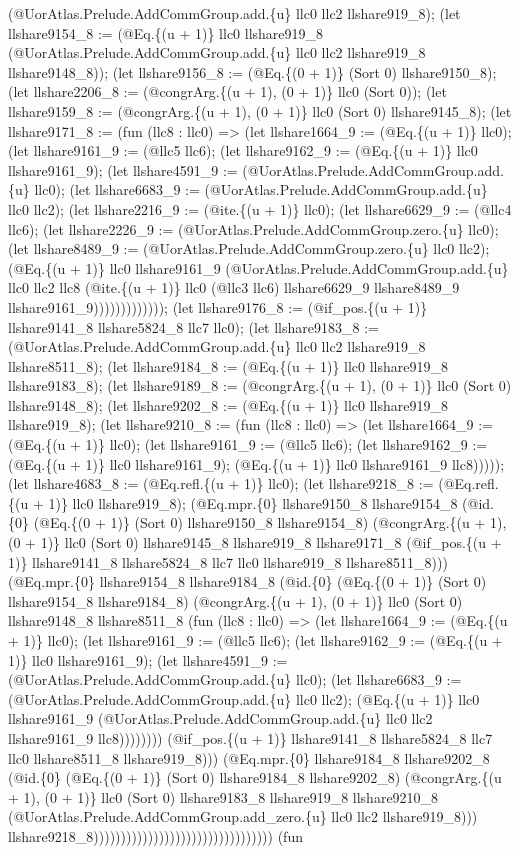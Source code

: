 \documentclass[11pt]{article}
\begin{document}
(@UorAtlas.Prelude.AddCommGroup.add.\{u\} llc0 llc2 llshare919\_8); (let llshare9154\_8 := (@Eq.\{(u + 1)\} llc0 llshare919\_8 (@UorAtlas.Prelude.AddCommGroup.add.\{u\} llc0 llc2 llshare919\_8 llshare9148\_8)); (let llshare9156\_8 := (@Eq.\{(0 + 1)\} (Sort 0) llshare9150\_8); (let llshare2206\_8 := (@congrArg.\{(u + 1), (0 + 1)\} llc0 (Sort 0)); (let llshare9159\_8 := (@congrArg.\{(u + 1), (0 + 1)\} llc0 (Sort 0) llshare9145\_8); (let llshare9171\_8 := (fun (llc8 : llc0) => (let llshare1664\_9 := (@Eq.\{(u + 1)\} llc0); (let llshare9161\_9 := (@llc5 llc6); (let llshare9162\_9 := (@Eq.\{(u + 1)\} llc0 llshare9161\_9); (let llshare4591\_9 := (@UorAtlas.Prelude.AddCommGroup.add.\{u\} llc0); (let llshare6683\_9 := (@UorAtlas.Prelude.AddCommGroup.add.\{u\} llc0 llc2); (let llshare2216\_9 := (@ite.\{(u + 1)\} llc0); (let llshare6629\_9 := (@llc4 llc6); (let llshare2226\_9 := (@UorAtlas.Prelude.AddCommGroup.zero.\{u\} llc0); (let llshare8489\_9 := (@UorAtlas.Prelude.AddCommGroup.zero.\{u\} llc0 llc2); (@Eq.\{(u + 1)\} llc0 llshare9161\_9 (@UorAtlas.Prelude.AddCommGroup.add.\{u\} llc0 llc2 llc8 (@ite.\{(u + 1)\} llc0 (@llc3 llc6) llshare6629\_9 llshare8489\_9 llshare9161\_9))))))))))))); (let llshare9176\_8 := (@if\_pos.\{(u + 1)\} llshare9141\_8 llshare5824\_8 llc7 llc0); (let llshare9183\_8 := (@UorAtlas.Prelude.AddCommGroup.add.\{u\} llc0 llc2 llshare919\_8 llshare8511\_8); (let llshare9184\_8 := (@Eq.\{(u + 1)\} llc0 llshare919\_8 llshare9183\_8); (let llshare9189\_8 := (@congrArg.\{(u + 1), (0 + 1)\} llc0 (Sort 0) llshare9148\_8); (let llshare9202\_8 := (@Eq.\{(u + 1)\} llc0 llshare919\_8 llshare919\_8); (let llshare9210\_8 := (fun (llc8 : llc0) => (let llshare1664\_9 := (@Eq.\{(u + 1)\} llc0); (let llshare9161\_9 := (@llc5 llc6); (let llshare9162\_9 := (@Eq.\{(u + 1)\} llc0 llshare9161\_9); (@Eq.\{(u + 1)\} llc0 llshare9161\_9 llc8))))); (let llshare4683\_8 := (@Eq.refl.\{(u + 1)\} llc0); (let llshare9218\_8 := (@Eq.refl.\{(u + 1)\} llc0 llshare919\_8); (@Eq.mpr.\{0\} llshare9150\_8 llshare9154\_8 (@id.\{0\} (@Eq.\{(0 + 1)\} (Sort 0) llshare9150\_8 llshare9154\_8) (@congrArg.\{(u + 1), (0 + 1)\} llc0 (Sort 0) llshare9145\_8 llshare919\_8 llshare9171\_8 (@if\_pos.\{(u + 1)\} llshare9141\_8 llshare5824\_8 llc7 llc0 llshare919\_8 llshare8511\_8))) (@Eq.mpr.\{0\} llshare9154\_8 llshare9184\_8 (@id.\{0\} (@Eq.\{(0 + 1)\} (Sort 0) llshare9154\_8 llshare9184\_8) (@congrArg.\{(u + 1), (0 + 1)\} llc0 (Sort 0) llshare9148\_8 llshare8511\_8 (fun (llc8 : llc0) => (let llshare1664\_9 := (@Eq.\{(u + 1)\} llc0); (let llshare9161\_9 := (@llc5 llc6); (let llshare9162\_9 := (@Eq.\{(u + 1)\} llc0 llshare9161\_9); (let llshare4591\_9 := (@UorAtlas.Prelude.AddCommGroup.add.\{u\} llc0); (let llshare6683\_9 := (@UorAtlas.Prelude.AddCommGroup.add.\{u\} llc0 llc2); (@Eq.\{(u + 1)\} llc0 llshare9161\_9 (@UorAtlas.Prelude.AddCommGroup.add.\{u\} llc0 llc2 llshare9161\_9 llc8)))))))) (@if\_pos.\{(u + 1)\} llshare9141\_8 llshare5824\_8 llc7 llc0 llshare8511\_8 llshare919\_8))) (@Eq.mpr.\{0\} llshare9184\_8 llshare9202\_8 (@id.\{0\} (@Eq.\{(0 + 1)\} (Sort 0) llshare9184\_8 llshare9202\_8) (@congrArg.\{(u + 1), (0 + 1)\} llc0 (Sort 0) llshare9183\_8 llshare919\_8 llshare9210\_8 (@UorAtlas.Prelude.AddCommGroup.add\_zero.\{u\} llc0 llc2 llshare919\_8))) llshare9218\_8))))))))))))))))))))))))))))))))) (fun 
\end{document}
